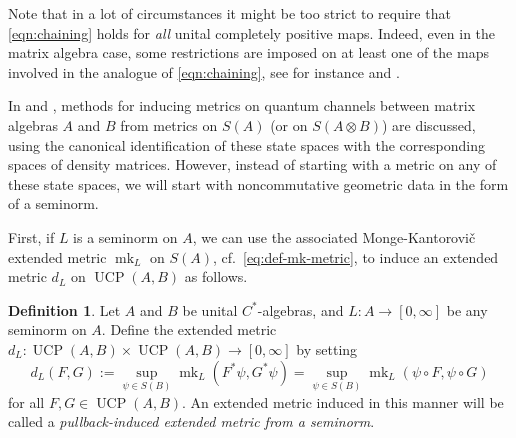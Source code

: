 \documentclass[11pt, a4paper, oneside, final, reqno]{amsart}
\newcommand{\UCP}{\operatorname{UCP}}
\newcommand{\mk}{\operatorname{mk}}
\theoremstyle{definition}
\newtheorem{definition}{Definition}[section]
\theoremstyle{plain}
\theoremstyle{remark}
\numberwithin{equation}{section}
\begin{document}
Note that in a lot of circumstances it might be too strict to require that \eqref{eqn:chaining} holds for \emph{all} unital completely positive maps. Indeed, even in the matrix algebra case, some restrictions are imposed on at least one of the maps involved in the analogue of \eqref{eqn:chaining}, see for instance \cite[p.~5]{Gilchrist} and \cite[p.~4]{Bussandri23}.

In \cite{Gilchrist} and \cite{BorovykVellambi25}, methods for inducing metrics on quantum channels between matrix algebras $A$ and $B$ from metrics on $S(A)$ (or on $S(A\otimes B)$) are discussed, using the canonical identification of these state spaces with the corresponding spaces of density matrices. However, instead of starting with a metric on any of these state spaces, we  will start with noncommutative geometric data in the form of a seminorm.

First, if $L$ is a seminorm on $A$, we can use the associated Monge-Kantorovi\v{c} extended metric $\mk_L$ on $S(A)$, cf.~\eqref{eq:def-mk-metric}, to induce an extended metric $d_L$ on $\UCP(A,B)$ as follows.

\begin{definition}\label{def:UCP metric D}
    Let $A$ and $B$ be unital $C^*$-algebras, and $L \colon A \to [0,\infty]$ be any seminorm on $A$. Define the extended metric $d_L \colon \UCP(A,B) \times \UCP(A,B) \to [0,\infty]$ by setting
    \begin{equation}\label{eqn:UCP metric D def}
        d_L(F,G) := \sup\limits_{\psi \in S(B)}\mk_L(F^*\psi,G^*\psi)
        = \sup\limits_{\psi \in S(B)}\mk_L(\psi\circ F, \psi\circ G)
    \end{equation}
        for all $F, G \in \UCP(A,B)$. An extended metric induced in this manner will be called a \emph{pullback-induced extended metric from a seminorm}.
\end{definition}
\end{document}
